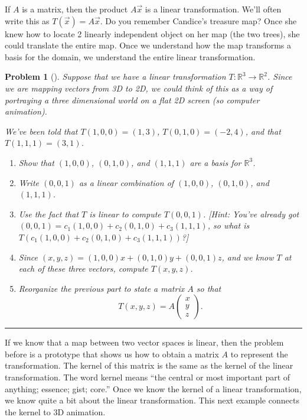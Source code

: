 \documentclass[letterpaper,oneside]{book}%
\theoremstyle{plain}
\theoremstyle{box}
\theoremstyle{problem}
\newtheorem{problemnum}{Problem}[chapter]
\newenvironment{problem}[1][]{\begin{problemnum}[#1]}{\end{problemnum}\nopagebreak\hrule\bigskip}
\newcommand{\pvec}[1]{\begin{pmatrix} #1 \end{pmatrix}}
\begin{document}










If $A$ is a matrix, then the product $A\vec x$ is a linear transformation.  We'll often write this as $T(\vec x) = A\vec x$. Do you remember Candice's treasure map?  Once she knew how to locate 2 linearly independent object on her map (the two trees), she could translate the entire map. Once we understand how the map transforms a basis for the domain, we understand the entire linear transformation.  

\begin{problem}
 Suppose that we have a linear transformation $T:\mathbb{R}^3\to \mathbb{R}^2$. Since we are mapping vectors from 3D to 2D, we could think of this as a way of portraying a three dimensional world on a flat 2D screen (so computer animation). 
 
 We've been told that $T(1,0,0) = (1,3)$, $T(0,1,0) = (-2,4)$, and that $T(1,1,1)=(3,1)$. 
\begin{enumerate}
 \item Show that $(1,0,0)$, $(0,1,0)$, and $(1,1,1)$ are a basis for $\mathbb{R}^3$. 
 \item Write $(0,0,1)$ as a linear combination of $(1,0,0)$, $(0,1,0)$, and $(1,1,1)$.
 \item Use the fact that $T$ is linear to compute $T(0,0,1)$. [Hint: You've already got 
 $(0,0,1) = c_1(1,0,0)+c_2(0,1,0)+c_3(1,1,1)$, so what is $T(c_1(1,0,0)+c_2(0,1,0)+c_3(1,1,1))$?]
 \item Since $(x,y,z) = (1,0,0)x+(0,1,0)y+(0,0,1)z$, and we know $T$ at each of these three vectors, compute $T(x,y,z)$. 
 \item Reorganize the previous part to state a matrix $A$ so that $$T(x,y,z)= A\pvec{x\\y\\z}.$$ 
\end{enumerate}
    
\end{problem}



If we know that a map between two vector spaces is linear, then the problem before is a prototype that shows us how to obtain a matrix $A$ to represent the transformation. The kernel of this matrix is the same as the kernel of the linear transformation.  The word kernel  means ``the central or most important part of anything; essence; gist; core.''    Once we know the kernel of a linear transformation, we know quite a bit about the linear transformation. This next example connects the kernel to 3D animation.
\end{document}
